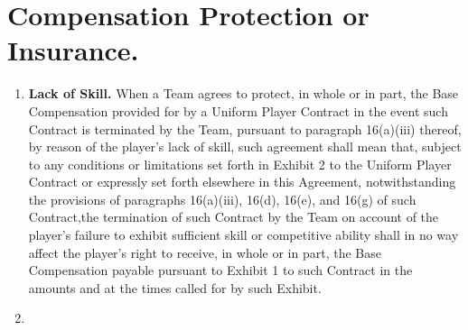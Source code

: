 \documentclass[
]{book}
\providecommand{\tightlist}{%
  \setlength{\itemsep}{0pt}\setlength{\parskip}{0pt}}
\begin{document}
\hypertarget{compensation-protection-or-insurance.}{%
\section{Compensation Protection or Insurance.}\label{compensation-protection-or-insurance.}}

\begin{enumerate}
\def\labelenumi{(\alph{enumi})}
\tightlist
\item
  \textbf{Lack of Skill.} When a Team agrees to protect, in whole or in part, the Base Compensation provided for by a Uniform Player Contract in the event such Contract is terminated by the Team, pursuant to paragraph 16(a)(iii) thereof, by reason of the player's lack of skill, such agreement shall mean that, subject to any conditions or limitations set forth in Exhibit 2 to the Uniform Player Contract or expressly set forth elsewhere in this Agreement, notwithstanding the provisions of paragraphs 16(a)(iii), 16(d), 16(e), and 16(g) of such Contract,the termination of such Contract by the Team on account of the player's failure to exhibit sufficient skill or competitive ability shall in no way affect the player's right to receive, in whole or in part, the Base Compensation payable pursuant to Exhibit 1 to such Contract in the amounts and at the times called for by such Exhibit.
\item

\end{enumerate}
\end{document}
